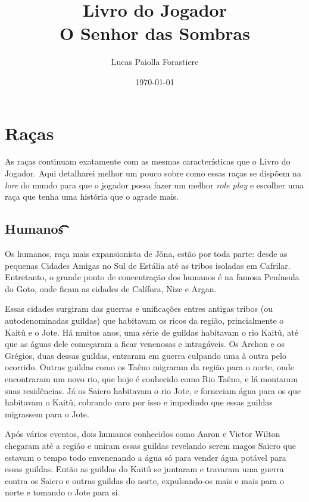 \documentclass{RPG_Adventure}[2021/10/20]
\title{Livro do Jogador\\ \Huge{O Senhor das Sombras}}
\date{\today}
\author{Lucas Paiolla Forastiere}
\begin{document}
\maketitle
\tableofcontents
\newpage


\chapter{Raças}%
\label{cha:racas}

As raças continuam exatamente com as mesmas características que o Livro do
Jogador. Aqui detalharei melhor um pouco sobre como essas raças se dispõem na
\textit{lore} do mundo para que o jogador possa fazer um melhor \textit{role
play} e escolher uma raça que tenha uma história que o agrade mais.

\section*{Humanos\t\t\t\t\t\t\t\t\t\t\t\t\t}%
\label{sec:humanos}

Os humanos, raça mais expansionista de Jǒna, estão por toda parte: desde as
pequenas Cidades Amigas no Sul de Estália até as tribos isoladas em Cafrilar.
Entretanto, o grande ponto de concentração dos humanos é na famosa Península do
Goto, onde ficam as cidades de Calífora, Nize e Argan.

Essas cidades surgiram das guerras e unificações entres antigas tribos (ou
autodenominadas guildas) que habitavam os ricos da região, princialmente o
Kaitû e o Jote. Há muitos anos, uma série de guildas habitavam o rio Kaitû, até
que as águas dele começaram a ficar venenosas e intragáveis. Os Archon e os
Grégios, duas dessas guildas, entraram em guerra culpando uma à outra pelo
ocorrido. Outras guildas como os Taêno migraram da região para o norte, onde
encontraram um novo rio, que hoje é conhecido como Rio Taêno, e lá montaram suas
residências. Já os Saicro habitavam o rio Jote, e forneciam água para os que
habitavam o Kaitû, cobrando caro por isso e impedindo que essas guildas
migrassem para o Jote.

Após vários eventos, dois humanos conhecidos como Aaron e Victor Wilton chegaram
até a região e uniram essas guildas revelando serem magos Saicro que estavam o
tempo todo envenenando a água só para vender água potável para essas guildas.
Então as guildas do Kaitû se juntaram e travaram uma guerra contra os Saicro e
outras guildas do norte, expulsando-os mais e mais para o norte e tomando o Jote
para si.
\end{document}
